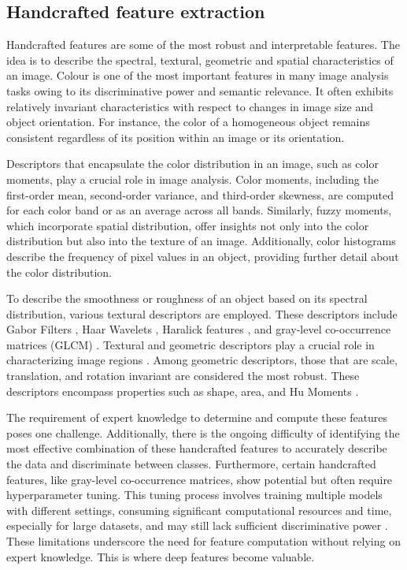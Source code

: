 \subsection{Handcrafted feature extraction}
Handcrafted features are some of the most robust and interpretable features. The idea is to describe the spectral, textural, geometric and spatial characteristics of an image. Colour is one of the most important features in many image analysis tasks owing to its discriminative power and semantic relevance. It often exhibits relatively invariant characteristics with respect to changes in image size and object orientation. For instance, the color of a homogeneous object remains consistent regardless of its position within an image or its orientation. 

Descriptors that encapsulate the color distribution in an image, such as color moments, play a crucial role in image analysis. Color moments, including the first-order mean, second-order variance, and third-order skewness, are computed for each color band or as an average across all bands. Similarly, fuzzy moments, which incorporate spatial distribution, offer insights not only into the color distribution but also into the texture of an image. Additionally, color histograms describe the frequency of pixel values in an object, providing further detail about the color distribution\cite{tiwari_feature_2013}.

To describe the smoothness or roughness of an object based on its spectral distribution, various textural descriptors are employed. These descriptors include Gabor Filters \cite{grigorescu_comparison_2002}, Haar Wavelets \cite{raju_texture_2008}, Haralick features \cite{porebski_haralick_2008}, and gray-level co-occurrence matrices (GLCM) \cite{barburiceanu_3d_2021}. Textural and geometric descriptors play a crucial role in characterizing image regions \cite{tiwari_feature_2013}. Among geometric descriptors, those that are scale, translation, and rotation invariant are considered the most robust. These descriptors encompass properties such as shape, area, and Hu Moments \cite{ming-kuei_hu_visual_1962}.

The requirement of expert knowledge to determine and compute these features poses one challenge. Additionally, there is the ongoing difficulty of identifying the most effective combination of these handcrafted features to accurately describe the data and discriminate between classes. Furthermore, certain handcrafted features, like gray-level co-occurrence matrices, show potential but often require hyperparameter tuning. This tuning process involves training multiple models with different settings, consuming significant computational resources and time, especially for large datasets, and may still lack sufficient discriminative power \cite{chen_adaptive_2020}. These limitations underscore the need for feature computation without relying on expert knowledge. This is where deep features become valuable.


